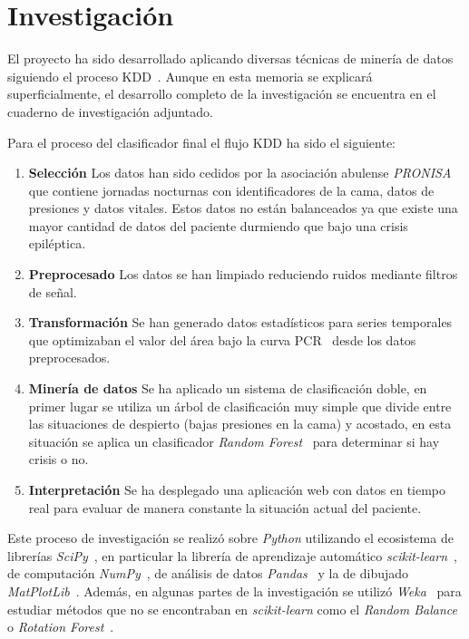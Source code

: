 
\section{Investigación}

El proyecto ha sido desarrollado aplicando diversas técnicas de minería de datos siguiendo el proceso KDD~\cite{ubu:mineria1}. Aunque en esta memoria se explicará superficialmente, el desarrollo completo de la investigación se encuentra en el cuaderno de investigación adjuntado.

Para el proceso del clasificador final el flujo KDD ha sido el siguiente:

\begin{enumerate}
	\item \textbf{Selección}
		Los datos han sido cedidos por la asociación abulense \textit{PRONISA} que contiene jornadas nocturnas con identificadores de la cama, datos de presiones y datos vitales. Estos datos no están balanceados ya que existe una mayor cantidad de datos del paciente durmiendo que bajo una crisis epiléptica.
	\item \textbf{Preprocesado}
		Los datos se han limpiado reduciendo ruidos mediante filtros de señal.
	\item \textbf{Transformación}
		Se han generado datos estadísticos para series temporales que optimizaban el valor del área bajo la curva PCR~\cite{saito2015precision} desde los datos preprocesados.
	\item \textbf{Minería de datos}
		Se ha aplicado un sistema de clasificación doble, en primer lugar se utiliza un árbol de clasificación muy simple que divide entre las situaciones de despierto (bajas presiones en la cama) y acostado, en esta situación se aplica un clasificador \textit{Random Forest}~\cite{breiman2001random} para determinar si hay crisis o no.
	\item \textbf{Interpretación}
		Se ha desplegado una aplicación web con datos en tiempo real para evaluar de manera constante la situación actual del paciente.
\end{enumerate}

Este proceso de investigación se realizó sobre \textit{Python} utilizando el ecosistema de librerías \textit{SciPy}~\cite{tool:scipy}, en particular la librería de aprendizaje automático \textit{scikit-learn}~\cite{tool:scikit-learn}, de computación \textit{NumPy}~\cite{tool:numpy}, de análisis de datos \textit{Pandas}~\cite{tool:pandas} y la de dibujado \textit{MatPlotLib}~\cite{tool:matplotlib}. Además, en algunas partes de la investigación se utilizó \textit{Weka}~\cite{tool:weka} para estudiar métodos que no se encontraban en \textit{scikit-learn} como el \textit{Random Balance}~\cite{diez2015random} o \textit{Rotation Forest}~\cite{rodriguez2006rotation}.

